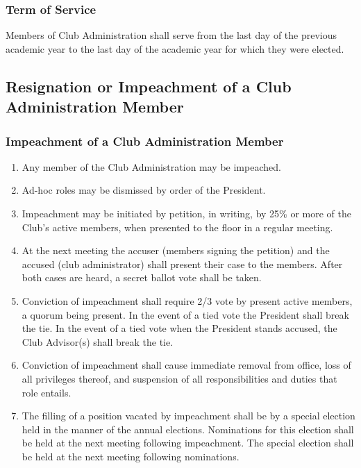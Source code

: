 \documentclass[english,11pt]{article}
\begin{document}
\subsubsection{Term of Service} \label{subsect:cadmin:selection:terms}
Members of Club Administration shall serve from the last day of the previous academic year to the last day of the academic year for which they were elected.

\subsection{Resignation or Impeachment of a Club Administration Member} \label{sect:cadmin:removal}
\subsubsection{Impeachment of a Club Administration Member} \label{subsect:cadmin:removal:impeachment}

\begin{enumerate}[label=\alph*.]
    \item Any member of the Club Administration may be impeached.
    \item Ad-hoc roles may be dismissed by order of the President.
    \item Impeachment may be initiated by petition, in writing, by 25\% or more of the Club's active members, when presented to the floor in a regular meeting.
    \item At the next meeting the accuser (members signing the petition) and the accused (club administrator) shall present their case to the members.
          After both cases are heard, a secret ballot vote shall be taken.
    \item Conviction of impeachment shall require 2/3 vote by present active members, a quorum being present.
          In the event of a tied vote the President shall break the tie.
          In the event of a tied vote when the President stands accused, the Club Advisor(s) shall break the tie.
    \item Conviction of impeachment shall cause immediate removal from office, loss of all privileges thereof, and suspension of all responsibilities and duties that role entails.
    \item The filling of a position vacated by impeachment shall be by a special election held in the manner of the annual elections.
          Nominations for this election shall be held at the next meeting following impeachment.
          The special election shall be held at the next meeting following nominations.
\end{enumerate}
\end{document}
